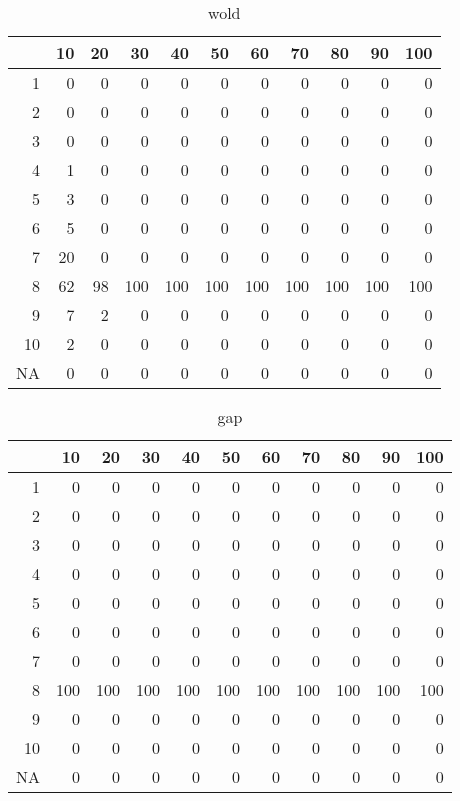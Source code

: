 \documentclass[11pt]{article}
\begin{document}
\begin{table}[H]
\centering
\begin{tabular}{rrrrrrrrrrr}
  \hline
 & 10 & 20 & 30 & 40 & 50 & 60 & 70 & 80 & 90 & 100 \\ 
  \hline
1 & 0 & 0 & 0 & 0 & 0 & 0 & 0 & 0 & 0 & 0 \\ 
  2 & 0 & 0 & 0 & 0 & 0 & 0 & 0 & 0 & 0 & 0 \\ 
  3 & 0 & 0 & 0 & 0 & 0 & 0 & 0 & 0 & 0 & 0 \\ 
  4 & 1 & 0 & 0 & 0 & 0 & 0 & 0 & 0 & 0 & 0 \\ 
  5 & 3 & 0 & 0 & 0 & 0 & 0 & 0 & 0 & 0 & 0 \\ 
  6 & 5 & 0 & 0 & 0 & 0 & 0 & 0 & 0 & 0 & 0 \\ 
  7 & 20 & 0 & 0 & 0 & 0 & 0 & 0 & 0 & 0 & 0 \\ 
  8 & 62 & 98 & 100 & 100 & 100 & 100 & 100 & 100 & 100 & 100 \\ 
  9 & 7 & 2 & 0 & 0 & 0 & 0 & 0 & 0 & 0 & 0 \\ 
  10 & 2 & 0 & 0 & 0 & 0 & 0 & 0 & 0 & 0 & 0 \\ 
  NA & 0 & 0 & 0 & 0 & 0 & 0 & 0 & 0 & 0 & 0 \\ 
   \hline
\end{tabular}
\caption{wold} 
\end{table}
\begin{table}[H]
\centering
\begin{tabular}{rrrrrrrrrrr}
  \hline
 & 10 & 20 & 30 & 40 & 50 & 60 & 70 & 80 & 90 & 100 \\ 
  \hline
1 & 0 & 0 & 0 & 0 & 0 & 0 & 0 & 0 & 0 & 0 \\ 
  2 & 0 & 0 & 0 & 0 & 0 & 0 & 0 & 0 & 0 & 0 \\ 
  3 & 0 & 0 & 0 & 0 & 0 & 0 & 0 & 0 & 0 & 0 \\ 
  4 & 0 & 0 & 0 & 0 & 0 & 0 & 0 & 0 & 0 & 0 \\ 
  5 & 0 & 0 & 0 & 0 & 0 & 0 & 0 & 0 & 0 & 0 \\ 
  6 & 0 & 0 & 0 & 0 & 0 & 0 & 0 & 0 & 0 & 0 \\ 
  7 & 0 & 0 & 0 & 0 & 0 & 0 & 0 & 0 & 0 & 0 \\ 
  8 & 100 & 100 & 100 & 100 & 100 & 100 & 100 & 100 & 100 & 100 \\ 
  9 & 0 & 0 & 0 & 0 & 0 & 0 & 0 & 0 & 0 & 0 \\ 
  10 & 0 & 0 & 0 & 0 & 0 & 0 & 0 & 0 & 0 & 0 \\ 
  NA & 0 & 0 & 0 & 0 & 0 & 0 & 0 & 0 & 0 & 0 \\ 
   \hline
\end{tabular}
\caption{gap} 
\end{table}
\end{document}
